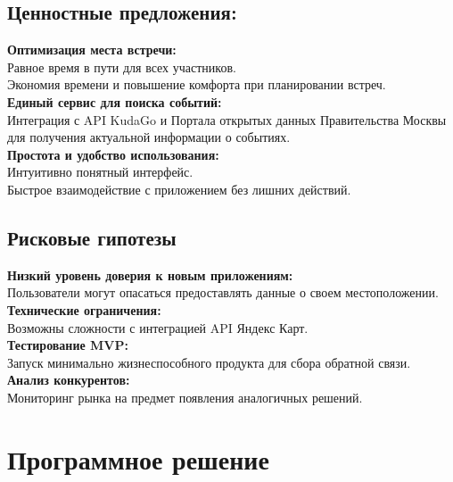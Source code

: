 \documentclass[a4paper,12pt]{extarticle}
\begin{document}
\subsection{Ценностные предложения:}
\noindent
\textbf{Оптимизация места встречи:} \\
Равное время в пути для всех участников.
\\
Экономия времени и повышение комфорта при планировании встреч.
\\
\textbf{Единый сервис для поиска событий:} \\
Интеграция с API KudaGo и Портала открытых данных Правительства Москвы для получения актуальной информации о событиях.
\\
\textbf{Простота и удобство использования:} \\
Интуитивно понятный интерфейс.
\\
Быстрое взаимодействие с приложением без лишних действий.

\subsection{Рисковые гипотезы} 
\noindent
\textbf{Низкий уровень доверия к новым приложениям:} \\
Пользователи могут опасаться предоставлять данные о своем местоположении.
\\
\textbf{Технические ограничения:} \\
Возможны сложности с интеграцией API Яндекс Карт. 
\\
\textbf{Тестирование MVP:} \\
Запуск минимально жизнеспособного продукта для сбора обратной связи.
\\
\textbf{Анализ конкурентов:} \\
Мониторинг рынка на предмет появления аналогичных решений.

\section{Программное решение}
\end{document}
